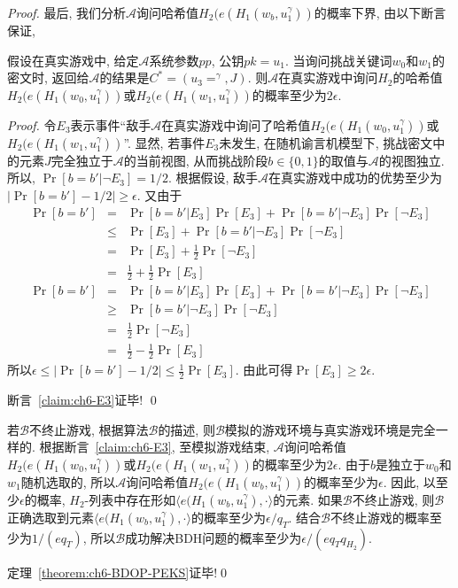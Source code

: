 \begin{proof}
最后, 我们分析$\mathcal{A}$询问哈希值$H_2(e(H_1(w_b, u_1^\gamma))$的概率下界, 由以下断言保证,
\begin{claim}\label{claim:ch6-E3}
假设在真实游戏中, 给定$\mathcal{A}$系统参数$pp$, 公钥$pk = u_1$. 当询问挑战关键词$w_0$和$w_1$的密文时, 返回给$\mathcal{A}$的结果是$C^* = (u_3 = ^\gamma, J)$. 则$\mathcal{A}$在真实游戏中询问$H_2$的哈希值$H_2(e(H_1(w_0, u_1^\gamma))$或$H_2(e(H_1(w_1, u_1^\gamma))$的概率至少为$2\epsilon$.
\end{claim}
\begin{proof}
令$E_3$表示事件``敌手$\mathcal{A}$在真实游戏中询问了哈希值$H_2(e(H_1(w_0, u_1^\gamma))$或$H_2(e(H_1(w_1, u_1^\gamma))$''. 显然, 若事件$E_3$未发生, 在随机谕言机模型下, 挑战密文中的元素$J$完全独立于$\mathcal{A}$的当前视图, 从而挑战阶段$b \in \{0, 1\}$的取值与$\mathcal{A}$的视图独立. 所以, $\Pr[b = b'| \neg E_3] = 1/2$. 根据假设, 敌手$\mathcal{A}$在真实游戏中成功的优势至少为$|\Pr[b = b'] - 1/2| \geq \epsilon$. 又由于
\begin{eqnarray*}
\Pr[b = b'] & = &   \Pr[b = b' | E_3]\Pr[E_3] + \Pr[b = b' | \neg E_3]\Pr[\neg E_3] \\
            & \leq & \Pr[E_3] + \Pr[b = b' | \neg E_3]\Pr[\neg E_3] \\
            & = &   \Pr[E_3] + \frac{1}{2}\Pr[\neg E_3] \\
            & = &   \frac{1}{2} + \frac{1}{2}\Pr[E_3] 
\end{eqnarray*}
\begin{eqnarray*}
\Pr[b = b'] & = &   \Pr[b = b' | E_3]\Pr[E_3] + \Pr[b = b' | \neg E_3]\Pr[\neg E_3] \\
            & \geq & \Pr[b = b' | \neg E_3]\Pr[\neg E_3] \\
            & = &   \frac{1}{2}\Pr[\neg E_3] \\
            & = &   \frac{1}{2} - \frac{1}{2}\Pr[E_3] 
\end{eqnarray*}
所以$\epsilon \leq |\Pr[b = b'] - 1/2| \leq \frac{1}{2}\Pr[E_3]$. 由此可得$\Pr[E_3] \geq 2\epsilon$.

断言~\ref{claim:ch6-E3}证毕! \qed  
\end{proof}

若$\mathcal{B}$不终止游戏, 根据算法$\mathcal{B}$的描述, 则$\mathcal{B}$模拟的游戏环境与真实游戏环境是完全一样的. 根据断言~\ref{claim:ch6-E3}, 至模拟游戏结束, $\mathcal{A}$询问哈希值$H_2(e(H_1(w_0, u_1^\gamma))$或$H_2(e(H_1(w_1, u_1^\gamma))$的概率至少为$2\epsilon$. 由于$b$是独立于$w_0$和$w_1$随机选取的, 所以$\mathcal{A}$询问哈希值$H_2(e(H_1(w_b, u_1^\gamma))$的概率至少为$\epsilon$. 因此, 以至少$\epsilon$的概率, $H_2$-列表中存在形如$\langle e(H_1(w_b, u_1^\gamma), \cdot \rangle$的元素. 如果$\mathcal{B}$不终止游戏, 则$\mathcal{B}$正确选取到元素$\langle e(H_1(w_b, u_1^\gamma), \cdot \rangle$的概率至少为$\epsilon/q_T$. 结合$\mathcal{B}$不终止游戏的概率至少为$1/(eq_T)$, 所以$\mathcal{B}$成功解决BDH问题的概率至少为$\epsilon/(eq_Tq_{H_2})$.

定理~\ref{theorem:ch6-BDOP-PEKS}证毕!\qed

\end{proof}

